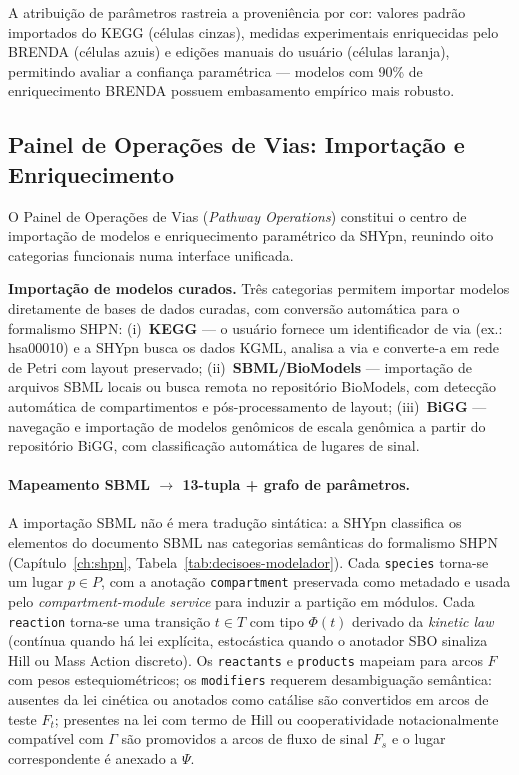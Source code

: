 A atribuição de parâmetros rastreia a proveniência por cor: valores padrão
importados do KEGG (células cinzas), medidas experimentais enriquecidas pelo
BRENDA (células azuis) e edições manuais do usuário (células laranja), permitindo
avaliar a confiança paramétrica --- modelos com 90\% de enriquecimento BRENDA
possuem embasamento empírico mais robusto.

\subsection{Painel de Operações de Vias: Importação e Enriquecimento}

O Painel de Operações de Vias (\textit{Pathway Operations}) constitui o centro
de importação de modelos e enriquecimento paramétrico da SHYpn, reunindo oito
categorias funcionais numa interface unificada.

\textbf{Importação de modelos curados.}
Três categorias permitem importar modelos diretamente de bases de dados curadas,
com conversão automática para o formalismo SHPN:
(i)~\textbf{KEGG} --- o usuário fornece um identificador de via (ex.: hsa00010)
e a SHYpn busca os dados KGML, analisa a via e converte-a em rede de Petri
com layout preservado;
(ii)~\textbf{SBML/BioModels} --- importação de arquivos SBML locais ou busca
remota no repositório BioModels, com detecção automática de compartimentos e
pós-processamento de layout;
(iii)~\textbf{BiGG} --- navegação e importação de modelos genômicos de escala
genômica a partir do repositório BiGG, com classificação automática de
lugares de sinal.

\paragraph{Mapeamento SBML $\to$ 13-tupla + grafo de parâmetros.}
A importação SBML não é mera tradução sintática: a SHYpn classifica os
elementos do documento SBML nas categorias semânticas do formalismo SHPN
(Capítulo~\ref{ch:shpn}, Tabela~\ref{tab:decisoes-modelador}). Cada
\texttt{species} torna-se um lugar $p \in P$, com a anotação
\texttt{compartment} preservada como metadado e usada pelo
\textit{compartment-module service} para induzir a partição em módulos.
Cada \texttt{reaction} torna-se uma transição $t \in T$ com tipo $\Phi(t)$
derivado da \textit{kinetic law} (contínua quando há lei explícita,
estocástica quando o anotador SBO sinaliza Hill ou Mass Action discreto).
Os \texttt{reactants} e \texttt{products} mapeiam para arcos $F$ com pesos
estequiométricos; os \texttt{modifiers} requerem desambiguação semântica:
ausentes da lei cinética ou anotados como catálise são convertidos em
arcos de teste $F_t$; presentes na lei com termo de Hill ou cooperatividade
notacionalmente compatível com $\Gamma$ são promovidos a arcos de fluxo de
sinal $F_s$ e o lugar correspondente é anexado a $\Psi$.

